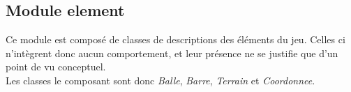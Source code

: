 \subsection{Module element}
\label{sub:Module element}
  \par Ce module est composé de classes de descriptions des éléments du jeu.
  Celles ci n'intègrent donc aucun comportement, et leur présence ne se justifie que d'un point de vu conceptuel.\\
  Les classes le composant sont donc \textit{Balle}, \textit{Barre}, \textit{Terrain} et \textit{Coordonnee}.
